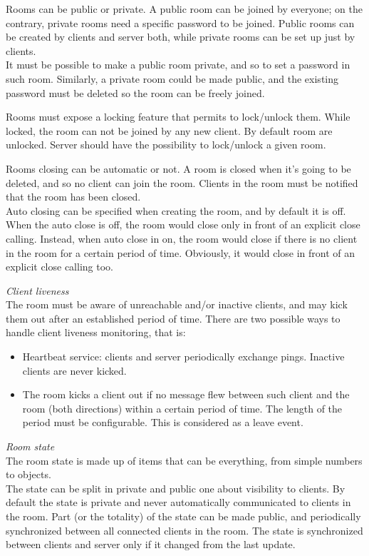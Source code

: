 \bigskip
Rooms can be public or private. A public room can be joined by everyone; on the contrary, private rooms need a specific password to be joined.
Public rooms can be created by clients and server both, while private rooms can be set up just by clients.  
\\
It must be possible to make a public room private, and so to set a password in such room. Similarly, a private room could be made public, and the existing password must be deleted so the room can be freely joined.  

\bigskip
Rooms must expose a locking feature that permits to lock/unlock them. While locked, the room can not be joined by any new client. By default room are unlocked.
Server should have the possibility to lock/unlock a given room.

\bigskip
Rooms closing can be automatic or not. A room is closed when it's going to be deleted, and so no client can join the room. Clients in the room must be notified that the room has been closed. 
\\
Auto closing can be specified when creating the room, and by default it is off.
\\
When the auto close is off, the room would close only in front of an explicit close calling.
Instead, when auto close in on, the room would close if there is no client in the room for a certain period of time. Obviously, it would close in front of an explicit close calling too.

\bigskip
\textit{Client liveness} 
\\
The room must be aware of unreachable and/or inactive clients, and may kick them out after an established period of time. There are two possible ways to handle client liveness monitoring, that is:
\begin{itemize}
\item Heartbeat service: clients and server periodically exchange pings. Inactive clients are never kicked.  
\item The room kicks a client out if no message flew between such client and the room (both directions) within a certain period of time. The length of the period must be configurable. This is considered as a leave event.
\end{itemize}

\bigskip
\textit{Room state}
\\
The room state is made up of items that can be everything, from simple numbers to objects.   
\\
The state can be split in private and public one about visibility to clients. By default the state is private and never automatically communicated to clients in the room. Part (or the totality) of the state can be made public, and periodically synchronized between all connected clients in the room. The state is synchronized between clients and server only if it changed from the last update. 

